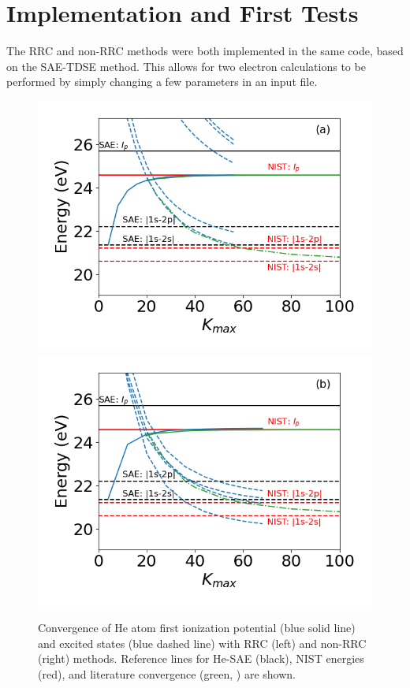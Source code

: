 
\section{Implementation and First Tests} %
\label{sec:implementation_and_first_tests}
The RRC and non-RRC methods were both implemented in the same code, based on the SAE-TDSE method. This allows for two electron calculations to be performed by simply changing a few parameters in an input file. 


\begin{figure}[!ht]
\centering
\includegraphics[width=0.49\linewidth]{figs/Two_electron/2nd_order_convergence.png}
\includegraphics[width=0.49\linewidth]{figs/Two_electron/2nd_order_convergence_no_RRC.png}
\caption{Convergence of He atom first ionization potential (blue solid line) and excited states (blue dashed line) with RRC (left) and non-RRC (right) methods. Reference lines for He-SAE (black), NIST energies (red), and literature convergence (green, \cite{khan2015}) are shown.
} 
  \label{fig:he_2e_converg}
\end{figure}

